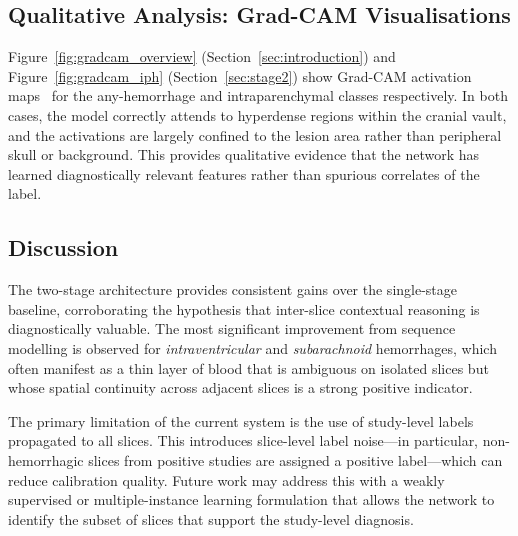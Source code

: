 \subsection{Qualitative Analysis: Grad-CAM Visualisations}

Figure~\ref{fig:gradcam_overview} (Section~\ref{sec:introduction}) and
Figure~\ref{fig:gradcam_iph} (Section~\ref{sec:stage2}) show Grad-CAM
activation maps~\cite{selvaraju2017gradcam} for the any-hemorrhage and
intraparenchymal classes respectively.
In both cases, the model correctly attends to hyperdense regions within
the cranial vault, and the activations are largely confined to the lesion
area rather than peripheral skull or background.
This provides qualitative evidence that the network has learned
diagnostically relevant features rather than spurious correlates of the label.

\subsection{Discussion}

The two-stage architecture provides consistent gains over the single-stage
baseline, corroborating the hypothesis that inter-slice contextual reasoning
is diagnostically valuable.
The most significant improvement from sequence modelling is observed for
\emph{intraventricular} and \emph{subarachnoid} hemorrhages, which often
manifest as a thin layer of blood that is ambiguous on isolated slices but
whose spatial continuity across adjacent slices is a strong positive indicator.

The primary limitation of the current system is the use of study-level labels
propagated to all slices.
This introduces slice-level label noise---in particular, non-hemorrhagic slices
from positive studies are assigned a positive label---which can reduce
calibration quality.
Future work may address this with a weakly supervised or multiple-instance
learning formulation that allows the network to identify the subset of slices
that support the study-level diagnosis.
